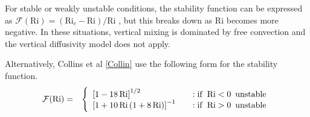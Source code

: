 For stable or weakly unstable conditions, the stability function can be expressed as
$\mathcal{F}(\mathrm{Ri}) = (\mathrm{Ri}_c-\mathrm{Ri})/\mathrm{Ri}$ \cite{Jacobson}, %
but this breaks down as $\mathrm{Ri}$ becomes more negative. In these situations, vertical mixing
is dominated by free convection and the vertical diffusivity model does not apply.

Alternatively, Collins et al \ref{Collin} use the following form for the stability function.
\begin{eqnarray}\label{VarDiff_Eq_F_Collins}
\mathcal{F}(\mathrm{Ri}) &=& \left\{ \begin{array} {l@{\quad \quad}l}
 \left[ 1 -18 \, \mathrm{Ri} \right]^{1/2}                         &: \mathrm{if}\,\,\, \mathrm{Ri} < 0 \,\,\, \mathrm{unstable} \\
 \left[ 1+ 10 \, \mathrm{Ri} \, (1+8 \, \mathrm{Ri}) \right]^{-1}  &: \mathrm{if}\,\,\, \mathrm{Ri} > 0 \,\,\, \mathrm{unstable}
\end{array}
\right.
\end{eqnarray}



